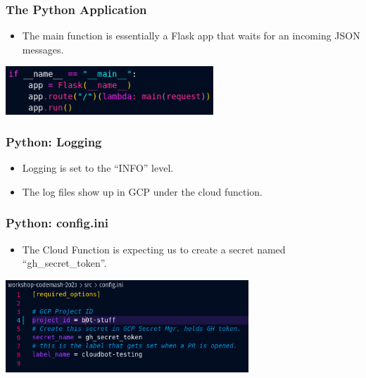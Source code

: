 \documentclass[aspectratio=169]{beamer}
\begin{document}
\begin{frame}
	\frametitle{The Python Application}

	\begin{itemize}
		\item The main function is essentially a Flask app that waits for an incoming JSON messages.
	\end{itemize}
	\begin{center}
		\includegraphics[width=0.585\textwidth]{../images/main-function-py.png}
	\end{center}

\end{frame}

\begin{frame}
	\frametitle{Python: Logging}
	
	\begin{itemize}
		\item Logging is set to the ``INFO'' level.
		\item The log files show up in GCP under the cloud function.
	\end{itemize}
\end{frame}

\begin{frame}
	\frametitle{Python: config.ini}
	
	\begin{itemize}
		\item The Cloud Function is expecting us to create a secret named ``gh\_secret\_token''.
	\end{itemize}
	\vspace{2mm}

	\begin{center}
		\includegraphics[width=0.685\textwidth]{../images/config.ini.png}
	\end{center}
\end{frame}
\end{document}
